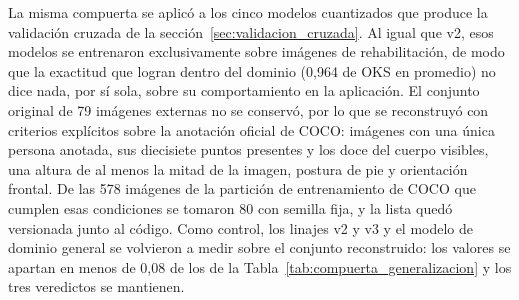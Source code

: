 %
%
%

La misma compuerta se aplicó a los cinco modelos cuantizados que produce la validación cruzada de la sección~\ref{sec:validacion_cruzada}. Al igual que v2, esos modelos se entrenaron exclusivamente sobre imágenes de rehabilitación, de modo que la exactitud que logran dentro del dominio (0,964 de OKS en promedio) no dice nada, por sí sola, sobre su comportamiento en la aplicación. El conjunto original de 79 imágenes externas no se conservó, por lo que se reconstruyó con criterios explícitos sobre la anotación oficial de COCO: imágenes con una única persona anotada, sus diecisiete puntos presentes y los doce del cuerpo visibles, una altura de al menos la mitad de la imagen, postura de pie y orientación frontal. De las 578 imágenes de la partición de entrenamiento de COCO que cumplen esas condiciones se tomaron 80 con semilla fija, y la lista quedó versionada junto al código. Como control, los linajes v2 y v3 y el modelo de dominio general se volvieron a medir sobre el conjunto reconstruido: los valores se apartan en menos de 0,08 de los de la Tabla~\ref{tab:compuerta_generalizacion} y los tres veredictos se mantienen.

